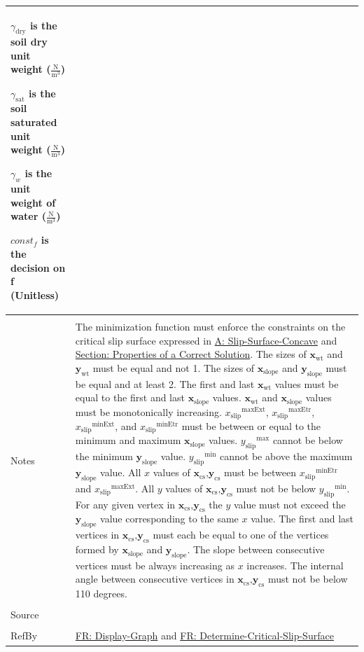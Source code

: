 \documentclass[12pt]{article}
\begin{document}
\begin{minipage}{\textwidth}
\begin{tabular}{>{\raggedright}p{}>{\raggedright\arraybackslash}p{}}
\begin{symbDescription}
              \item{${γ_{\text{dry}}}$ is the soil dry unit weight ($\frac{\text{N}}{\text{m}^{3}}$)}
              \item{${γ_{\text{sat}}}$ is the soil saturated unit weight ($\frac{\text{N}}{\text{m}^{3}}$)}
              \item{${γ_{w}}$ is the unit weight of water ($\frac{\text{N}}{\text{m}^{3}}$)}
              \item{$const_f$ is the decision on f (Unitless)}
              \end{symbDescription}
\\ \midrule \\
Notes & The minimization function must enforce the constraints on the critical slip surface expressed in \hyperref[assumpSSC]{A: Slip-Surface-Concave} and \hyperref[Sec:CorSolProps]{Section: Properties of a Correct Solution}. The sizes of ${\mathbf{x}_{\text{wt}}}$ and ${\mathbf{y}_{\text{wt}}}$ must be equal and not 1. The sizes of ${\mathbf{x}_{\text{slope}}}$ and ${\mathbf{y}_{\text{slope}}}$ must be equal and at least 2. The first and last ${\mathbf{x}_{\text{wt}}}$ values must be equal to the first and last ${\mathbf{x}_{\text{slope}}}$ values. ${\mathbf{x}_{\text{wt}}}$ and ${\mathbf{x}_{\text{slope}}}$ values must be monotonically increasing. ${{x_{\text{slip}}}^{\text{maxExt}}}$, ${{x_{\text{slip}}}^{\text{maxEtr}}}$, ${{x_{\text{slip}}}^{\text{minExt}}}$, and ${{x_{\text{slip}}}^{\text{minEtr}}}$ must be between or equal to the minimum and maximum ${\mathbf{x}_{\text{slope}}}$ values. ${{y_{\text{slip}}}^{\text{max}}}$ cannot be below the minimum ${\mathbf{y}_{\text{slope}}}$ value. ${{y_{\text{slip}}}^{\text{min}}}$ cannot be above the maximum ${\mathbf{y}_{\text{slope}}}$ value. All $x$ values of ${\mathbf{x}_{\text{cs}}}\text{,}{\mathbf{y}_{\text{cs}}}$ must be between ${{x_{\text{slip}}}^{\text{minEtr}}}$ and ${{x_{\text{slip}}}^{\text{maxExt}}}$. All $y$ values of ${\mathbf{x}_{\text{cs}}}\text{,}{\mathbf{y}_{\text{cs}}}$ must not be below ${{y_{\text{slip}}}^{\text{min}}}$. For any given vertex in ${\mathbf{x}_{\text{cs}}}\text{,}{\mathbf{y}_{\text{cs}}}$ the $y$ value must not exceed the ${\mathbf{y}_{\text{slope}}}$ value corresponding to the same $x$ value. The first and last vertices in ${\mathbf{x}_{\text{cs}}}\text{,}{\mathbf{y}_{\text{cs}}}$ must each be equal to one of the vertices formed by ${\mathbf{x}_{\text{slope}}}$ and ${\mathbf{y}_{\text{slope}}}$. The slope between consecutive vertices must be always increasing as $x$ increases. The internal angle between consecutive vertices in ${\mathbf{x}_{\text{cs}}}\text{,}{\mathbf{y}_{\text{cs}}}$ must not be below 110 degrees.
\\ \midrule \\
Source & \cite{li2010}
\\ \midrule \\
RefBy & \hyperref[displayGraph]{FR: Display-Graph} and \hyperref[determineCritSlip]{FR: Determine-Critical-Slip-Surface}
\\ \bottomrule
\end{tabular}
\end{minipage}
\end{document}
